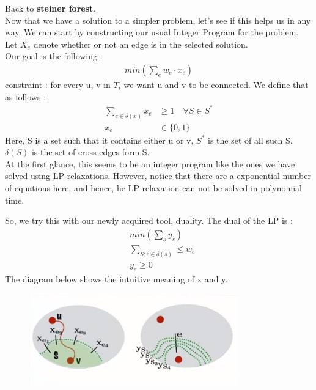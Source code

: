 \documentclass[12pt]{report}
\begin{document}
Back to \textbf{steiner forest}. \\
Now that we have a solution to a simpler problem, let's see if this helps us in any way. 
We can start by constructing our usual Integer Program for the problem.
Let $X_e$ denote whether or not an edge is in the selected solution.\\
Our goal is the following :
\begin{align*}
min(\sum _e w_e \cdot x_e)
\end{align*}
constraint : for every u, v in $T_i$ we want u and v to be connected. We define that as follows : \\
\begin{align*}
\sum _{e\in \delta(x)}x_e  & \geq 1 \quad \forall S \in S^{*} \\
x_e & \in \{0, 1\} 
\end{align*}
Here, S is a set such that it contains either u or v, $S^*$ is the set of all such S. \\
$\delta(S)$ is the set of cross edges form S. \\
At the first glance, this seems to be an integer program like the ones we have solved using LP-relaxations. However, notice that there are a exponential number of equations here, and hence, he LP relaxation can not be solved in polynomial time.

So, we try this with our newly acquired tool, duality.
The dual of the LP is :
\begin{align*}
&min(\sum _s y_s) \\
& \sum _{S:e\in\delta(s)} \leq w_e \\
& y_e \geq 0
\end{align*}
The diagram below shows the intuitive meaning of x and y.
\begin{figure}[h]
\includegraphics[width=9cm, height=4cm]{cuts.jpg}
\centering
\end{figure}\\
\end{document}
